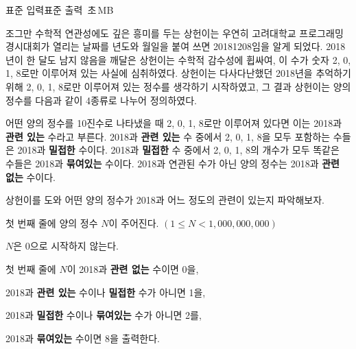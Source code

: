 \begin{problem}{\kcpcyeartitle}
    {표준 입력}{표준 출력}
    {\kcpcyeartime\,초}{\kcpcyearmemory\,MB}{}{\kcpcyearscore}
    
    조그만 수학적 연관성에도 깊은 흥미를 두는 상헌이는 우연히 고려대학교 프로그래밍 경시대회가 열리는 날짜를 년도와 월일을 붙여 쓰면 20181208임을 알게 되었다. 2018년이 한 달도 남지 않음을 깨달은 상헌이는 수학적 감수성에 휩싸여, 이 수가 숫자 2, 0, 1, 8로만 이루어져 있는 사실에 심취하였다. 상헌이는 다사다난했던 2018년을 추억하기 위해 2, 0, 1, 8로만 이루어져 있는 정수를 생각하기 시작하였고, 그 결과 상헌이는 양의 정수를 다음과 같이 4종류로 나누어 정의하였다.
    
    어떤 양의 정수를 10진수로 나타냈을 때 2, 0, 1, 8로만 이루어져 있다면 이는 2018과 \textbf{관련 있는} 수라고 부른다. 2018과 \textbf{관련 있는} 수 중에서 2, 0, 1, 8을 모두 포함하는 수들은 2018과 \textbf{밀접한} 수이다. 2018과 \textbf{밀접한} 수 중에서 2, 0, 1, 8의 개수가 모두 똑같은 수들은 2018과 \textbf{묶여있는} 수이다. 2018과 연관된 수가 아닌 양의 정수는 2018과 \textbf{관련 없는} 수이다.
    
    상헌이를 도와 어떤 양의 정수가 2018과 어느 정도의 관련이 있는지 파악해보자.
    
    \InputFile
    첫 번째 줄에 양의 정수 $ N $이 주어진다. $ (1 \leq N < 1,000,000,000) $
    
    $ N $은 0으로 시작하지 않는다.
    
    \OutputFile
    첫 번째 줄에 $ N $이 2018과 \textbf{관련 없는} 수이면 0을,
    
    2018과 \textbf{관련 있는} 수이나 \textbf{밀접한} 수가 아니면 1을,
    
    2018과 \textbf{밀접한} 수이나 \textbf{묶여있는} 수가 아니면 2를,
    
    2018과 \textbf{묶여있는} 수이면 8을 출력한다.
    
    \Examples
    
    \begin{example}
    \end{example}
    
\end{problem}


